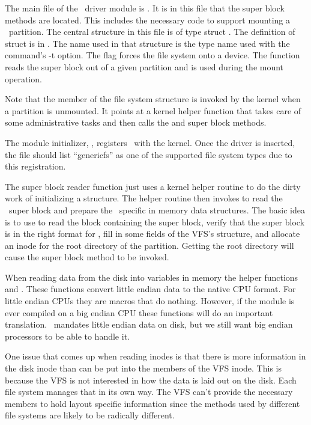 The main file of the \GenericFS\ driver module is . It is in this file that
the super block methods are located. This includes the necessary code to support mounting a
\GenericFS\ partition. The central structure in this file is  of type struct
. The definition of struct  is in
. The name used in that structure is the type name used with the
 command's -t option. The flag  forces the file system
onto a device. The function  reads the super block out of a given partition
and is used during the mount operation.

Note that the  member of the file system structure is invoked by the kernel when a
partition is unmounted. It points at a kernel helper function that takes care of some
administrative tasks and then calls the  and  super block
methods.

The module initializer, , registers \GenericFS\ with the kernel. Once the
driver is inserted, the file  should list ``genericfs'' as one of
the supported file system types due to this registration.

The super block reader function just uses a kernel helper routine to do the dirty work of
initializing a  structure. The helper routine then invokes
 to read the \GenericFS\ super block and prepare the \GenericFS\ specific
in memory data structures. The basic idea is to use  to read the block containing
the super block, verify that the super block is in the right format for \GenericFS, fill in some
fields of the VFS's  structure, and allocate an inode for the root directory
of the partition. Getting the root directory will cause the  super block method
to be invoked.

When reading data from the disk into variables in memory the helper functions 
and . These functions convert little endian data to the native CPU format. For
little endian CPUs they are macros that do nothing. However, if the module is ever compiled on a
big endian CPU these functions will do an important translation. \GenericFS\ mandates little
endian data on disk, but we still want big endian processors to be able to handle it.

One issue that comes up when reading inodes is that there is more information in the disk inode
than can be put into the members of the VFS inode. This is because the VFS is not interested in
how the data is laid out on the disk. Each file system manages that in its own way. The VFS
can't provide the necessary members to hold layout specific information since the methods used
by different file systems are likely to be radically different.

